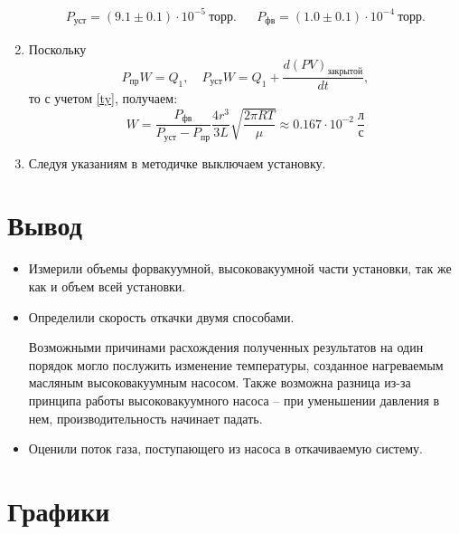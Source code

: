 \documentclass[11pt,a4paper]{article}
\begin{document}
\begin{enumerate}
		\begin{align}
			P_{\text{уст}} = (9.1 \pm 0.1) \cdot 10^{-5} ~ \text{торр}. && P_{фв} = (1.0 \pm 0.1) \cdot 10^{-4} ~ \text{торр}.
		\end{align}
		
		
		\item Поскольку
		$$P_\text{пр} W = Q_1, \quad P_\text{уст} W = Q_1 + \frac{d(PV)_\text{закрытой}}{dt},$$
		то с учетом \eqref{ty}, получаем:
		\begin{equation}
			W = \frac{P_\text{фв}}{P_\text{уст}-P_\text{пр}}\frac{4r^3}{3L}\sqrt{\frac{2\pi RT}{\mu}} \approx 0.167 \cdot 10^{-2}~\frac{\text{л}}{\text{с}}
		\end{equation}
		
		\item Следуя указаниям в методичке выключаем установку.
		
	\end{enumerate}
	 

	\section{Вывод}
	\begin{itemize}
		\item Измерили объемы форвакуумной, высоковакуумной части установки, так же как и объем всей установки.
		
		\item Определили скорость откачки двумя способами.
		
		Возможными причинами расхождения полученных результатов на один порядок могло послужить изменение температуры, созданное нагреваемым масляным высоковакуумным насосом. Также возможна разница из-за принципа работы высоковакуумного насоса -- при уменьшении давления в нем, производительность начинает падать.
		
		\item Оценили поток газа, поступающего из насоса в откачиваемую систему.
		
		
		
		
	\end{itemize}
	
	\newpage
	
	\section{Графики}
	
\end{document}
